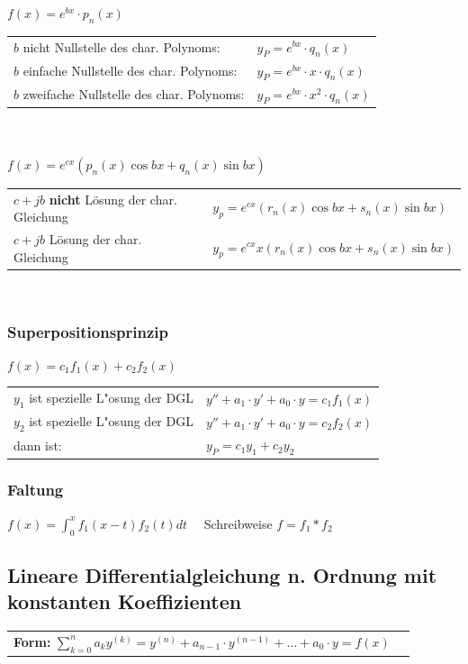\underline{$f(x)=e^{bx}\cdot p_n(x)$} \\
\begin{tabular}{p{8cm}p{4cm}}
$b$ nicht Nullstelle des char. Polynoms:    &
$y_P=e^{bx}\cdot q_n(x)$\\
$b$ einfache Nullstelle des char. Polynoms: &
$y_P=e^{bx}\cdot x \cdot q_n(x)$\\
$b$ zweifache Nullstelle des char. Polynoms: &
$y_P=e^{bx}\cdot x^2\cdot q_n(x)$
\end{tabular}\\ \\

\underline{$f(x)=e^{cx}(p_n(x)\cos{bx}+q_n(x)\sin{bx})$}\\
\begin{tabular}{p{8cm}p{8cm}}
$c+jb$ \textbf{nicht} Lösung der char. Gleichung &
$y_p=e^{cx}(r_n(x)\cos{bx}+s_n(x)\sin{bx})$ \\
$c+jb$ Lösung der char. Gleichung &
$y_p=e^{cx}x(r_n(x)\cos{bx}+s_n(x)\sin{bx})$\\
\end{tabular}\\

\subsubsection{Superpositionsprinzip}
$f(x)=c_1f_1(x)+c_2f_2(x)$\\
\begin{tabular}{p{8cm}p{4cm}}
$y_1$ ist spezielle L"osung der DGL &
$y''+a_1\cdot y'+a_0\cdot y=c_1f_1(x)$ \\
$y_2$ ist spezielle L"osung der DGL &
$y''+a_1\cdot y'+a_0\cdot y=c_2f_2(x)$ \\
dann ist:                          &
$y_P=c_1y_1+c_2y_2$\\
\end{tabular}

\subsubsection{Faltung}
$f(x)=\int_{0}^{x} f_{1}(x-t) f_{2}(t) d t \quad$ Schreibweise $f=f_{1} * f_{2}$

\subsection{Lineare Differentialgleichung n. Ordnung mit konstanten 
Koeffizienten }
\begin{tabular}{p{10cm}p{8cm}}
\textbf{Form:} $\sum\limits_{k=0}^na_ky^{(k)}= y^{(n)}+a_{n-1}\cdot y^{(n-1)}+\ldots +a_0\cdot y=f(x)$
\end{tabular}

